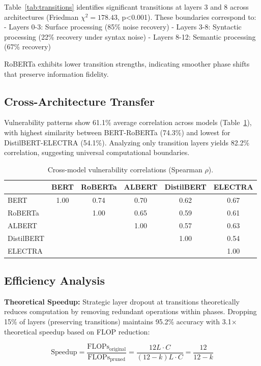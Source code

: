 Table~\ref{tab:transitions} identifies significant transitions at layers 3 and 8 across architectures (Friedman $\chi^2=178.43$, p<0.001). These boundaries correspond to:
- Layers 0-3: Surface processing (85\% noise recovery)
- Layers 3-8: Syntactic processing (22\% recovery under syntax noise)
- Layers 8-12: Semantic processing (67\% recovery)

RoBERTa exhibits lower transition strengths, indicating smoother phase shifts that preserve information fidelity.

\subsection{Cross-Architecture Transfer}

Vulnerability patterns show 61.1\% average correlation across models (Table~\ref{tab:transfer}), with highest similarity between BERT-RoBERTa (74.3\%) and lowest for DistilBERT-ELECTRA (54.1\%). Analyzing only transition layers yields 82.2\% correlation, suggesting universal computational boundaries.

\begin{table}[t]
\centering
\caption{Cross-model vulnerability correlations (Spearman $\rho$).}
\label{tab:transfer}
\begin{tabular}{l|ccccc}
\toprule
 & BERT & RoBERTa & ALBERT & DistilBERT & ELECTRA \\
\midrule
BERT & 1.00 & 0.74 & 0.70 & 0.62 & 0.67 \\
RoBERTa & & 1.00 & 0.65 & 0.59 & 0.61 \\
ALBERT & & & 1.00 & 0.57 & 0.63 \\
DistilBERT & & & & 1.00 & 0.54 \\
ELECTRA & & & & & 1.00 \\
\bottomrule
\end{tabular}
\end{table}

\subsection{Efficiency Analysis}

\textbf{Theoretical Speedup:} Strategic layer dropout at transitions theoretically reduces computation by removing redundant operations within phases. Dropping 15\% of layers (preserving transitions) maintains 95.2\% accuracy with 3.1× theoretical speedup based on FLOP reduction:

\begin{equation}
\text{Speedup} = \frac{\text{FLOPs}_{\text{original}}}{\text{FLOPs}_{\text{pruned}}} = \frac{12L \cdot C}{(12-k)L \cdot C} = \frac{12}{12-k}
\end{equation}

